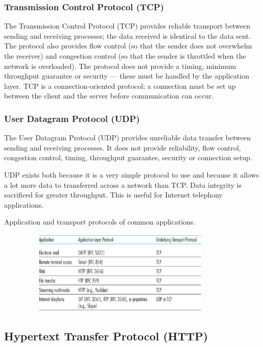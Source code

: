 \subsubsection{Transmission Control Protocol (TCP)}

The Transmission Control Protocol (TCP) provides reliable transport between sending and receiving processes; the data received is identical to the data sent.
The protocol also provides flow control (so that the sender does not overwhelm the receiver) and congestion control (so that the sender is throttled when the network is overloaded).
The protocol does not provide a timing, minimum throughput guarantee or security --- these must be handled by the application layer.
TCP is a connection-oriented protocol; a connection must be set up between the client and the server before communication can occur.

\subsubsection{User Datagram Protocol (UDP)}

The User Datagram Protocol (UDP) provides unreliable data transfer between sending and receiving processes.
It does not provide reliability, flow control, congestion control, timing, throughput guarantee, security or connection setup.

UDP exists both because it is a very simple protocol to use and because it allows a lot more data to transferred across a network than TCP.
Data integrity is sacrificed for greater throughput.
This is useful for Internet telephony applications.

\begin{table}[htp]
  \centering
  \caption*{Application and transport protocols of common applications.}
  \includegraphics[width=12cm,height=4cm]{unit-17/figures/transport-protocols.png}
\end{table}

\subsection{Hypertext Transfer Protocol (HTTP)}

